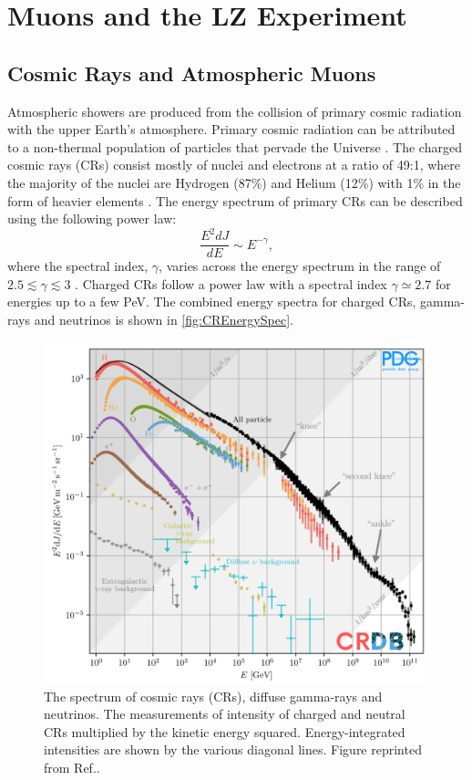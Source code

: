 \chapter{Muons and the LZ Experiment}\label{chap:Muons}
\section{Cosmic Rays and Atmospheric Muons}
Atmospheric showers are produced from the collision of primary cosmic radiation with the upper Earth's atmosphere. Primary cosmic radiation can be attributed to a non-thermal population of particles that pervade the Universe \cite{ParticleDataGroup:2024cfk}. The charged cosmic rays (CRs) consist mostly of nuclei and electrons at a ratio of 49:1, where the majority of the nuclei are Hydrogen (87\%) and Helium (12\%) with 1\% in the form of heavier elements \cite{Longair_2011}. The energy spectrum of primary CRs can be described using the following power law:
\begin{equation}\label{eqn:CREnergy}
    \frac{E^2dJ}{dE}\sim E^{-\gamma},
\end{equation}
where the spectral index, $\gamma$, varies across the energy spectrum in the range of $2.5\lesssim\gamma\lesssim3$ \cite{ParticleDataGroup:2024cfk}. Charged CRs follow a power law with a spectral index $\gamma\simeq2.7$ for energies up to a few PeV. The combined energy spectra for charged CRs, gamma-rays and neutrinos is shown in \autoref{fig:CREnergySpec}.
\begin{figure}[ht!]
    \centering
    \includegraphics[width=0.8\linewidth]{figures/Muons/CosmicRaySpectra.png}
    \caption{The spectrum of cosmic rays (CRs), diffuse gamma-rays and neutrinos. The measurements of intensity of charged and neutral CRs multiplied by the kinetic energy squared. Energy-integrated intensities are shown by the various diagonal lines. Figure reprinted from Ref.\cite{ParticleDataGroup:2024cfk}.}
    \label{fig:CREnergySpec}
\end{figure}
